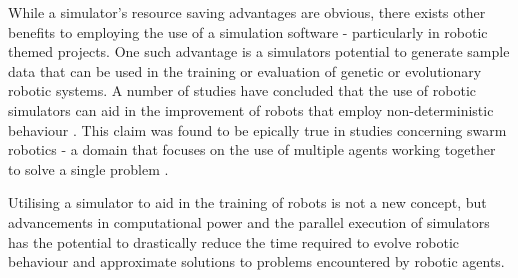 While a simulator's resource saving advantages are obvious, there exists other
benefits to employing the use of a simulation software - particularly in
robotic themed projects.
One such advantage is a simulators potential to generate sample data that can
be used in the training or evaluation of genetic or evolutionary robotic
systems.
A number of studies have concluded that the use of robotic simulators can
aid in the improvement of robots that employ non-deterministic behaviour
\cite{7139550,7139557}.
This claim was found to be epically true in studies concerning swarm robotics
- a domain that focuses on the use of multiple agents working together to solve
a single problem \cite{Wischmann864,R2016,Yao2014}.

Utilising a simulator to aid in the training of robots is not a new concept,
but advancements in computational power and the parallel execution of
simulators has the potential to drastically reduce the time required to evolve
robotic behaviour and approximate solutions to problems encountered by robotic
agents.


